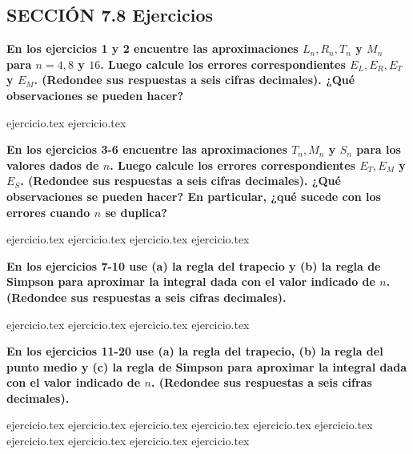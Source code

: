\subsection*{SECCIÓN 7.8 \quad Ejercicios}

\noindent\textbf{En los ejercicios 1 y 2 encuentre las aproximaciones $L_n, R_n, T_n$ y $M_n$ para $n = 4, 8$ y $16$. Luego calcule los errores correspondientes $E_L, E_R, E_T$ y $E_M$. (Redondee sus respuestas a seis cifras decimales). ¿Qué observaciones se pueden hacer?}
\begin{enumerate}
    {ejercicio.tex}
{ejercicio.tex}
\end{enumerate}

\vspace{0.5cm}
\noindent\textbf{En los ejercicios 3-6 encuentre las aproximaciones $T_n, M_n$ y $S_n$ para los valores dados de $n$. Luego calcule los errores correspondientes $E_T, E_M$ y $E_S$. (Redondee sus respuestas a seis cifras decimales). ¿Qué observaciones se pueden hacer? En particular, ¿qué sucede con los errores cuando $n$ se duplica?}
\begin{enumerate}
    \setcounter{enumi}{2}
    {ejercicio.tex}
{ejercicio.tex}
{ejercicio.tex}
{ejercicio.tex}
\end{enumerate}

\vspace{0.5cm}
\noindent\textbf{En los ejercicios 7-10 use (a) la regla del trapecio y (b) la regla de Simpson para aproximar la integral dada con el valor indicado de $n$. (Redondee sus respuestas a seis cifras decimales).}
\begin{enumerate}
    \setcounter{enumi}{6}
    {ejercicio.tex}
{ejercicio.tex}
{ejercicio.tex}
{ejercicio.tex}
\end{enumerate}

\vspace{0.5cm}
\noindent\textbf{En los ejercicios 11-20 use (a) la regla del trapecio, (b) la regla del punto medio y (c) la regla de Simpson para aproximar la integral dada con el valor indicado de $n$. (Redondee sus respuestas a seis cifras decimales).}
\begin{enumerate}
    \setcounter{enumi}{10}
    {ejercicio.tex}
{ejercicio.tex}
{ejercicio.tex}
{ejercicio.tex}
{ejercicio.tex}
{ejercicio.tex}
{ejercicio.tex}
{ejercicio.tex}
{ejercicio.tex}
{ejercicio.tex}
\end{enumerate}

